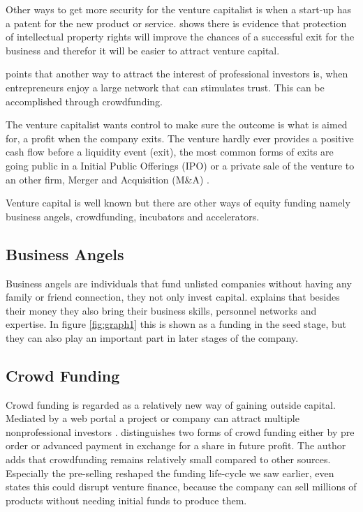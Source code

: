 \documentclass[a4paper, 11pt]{article}
\begin{document}
Other ways to get more security for the venture capitalist is when a start-up has a patent for the new product or service.
\cite{nadeau2011innovation} shows there is evidence that protection of intellectual property rights will improve the chances of a successful exit for the business and therefor it will be easier to attract venture capital.

 \cite{Roma} points that another way to attract the interest of professional investors is, when entrepreneurs enjoy a large network that can stimulates trust. This can be accomplished through crowdfunding.


The venture capitalist wants control to make sure the outcome is what is aimed for, a profit when the company exits. The venture hardly ever provides a positive cash flow before a liquidity event (exit), the most common forms of exits are going public in a Initial Public Offerings (IPO) or a private sale of the venture to an other firm, Merger and Acquisition (M\&A) \citep{nadeau2011innovation}.

Venture capital is well known but there are other ways of equity funding namely business angels, crowdfunding, incubators and accelerators.

\subsection{Business Angels}
Business angels are individuals that fund unlisted companies without having any family or friend connection, they not only invest capital. \cite{politis} explains that besides their money they also bring their business skills, personnel networks and expertise. In figure \ref{fig:graph1} this is shown as a funding in the seed stage, but they can also play an important part in later stages of the company.


\subsection{Crowd Funding}
Crowd funding is regarded as a relatively new way of gaining outside capital. Mediated by a web portal a project or company can attract multiple nonprofessional investors \citep{TiddBessant}. \cite{belleflamme} distinguishes two forms of crowd funding either by pre order or advanced payment in exchange for a share in future profit. The author adds that crowdfunding  remains relatively small compared to other sources. Especially the pre-selling reshaped the funding life-cycle we saw earlier, \cite{bella} even states this could disrupt venture finance, because the company can sell millions of products without needing initial funds to produce them.
\end{document}
